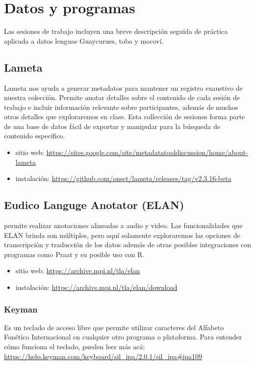 \documentclass[12pt]{article}
\begin{document}
\section{Datos y programas}
Las sesiones de trabajo incluyen una breve descripción seguida de práctica aplicada a datos lenguas Guaycurues, toba y mocoví.

\subsection{Lameta}
Lameta \citep{hatton.etal2021} nos ayuda a generar metadatos para mantener un registro exaustivo de nuestra colección. Permite anotar detalles sobre el contenido de cada sesión de trabajo e incluir información relevante sobre participantes, además de muchos otros detalles que exploraremos en clase. Esta collección de sesiones forma parte de una base de datos fácil de exportar y manipular para la búsqueda de contenido específico.
\begin{itemize}
\item sitio web: \url{https://sites.google.com/site/metadatatooldiscussion/home/about-lameta}
\item instalación: \url{https://github.com/onset/lameta/releases/tag/v2.3.16-beta} 
\end{itemize}


\subsection{Eudico Languge Anotator (ELAN)}

\citet{elan} permite realizar anotaciones alineadas a audio y video. Las funcionalidades que ELAN brinda son múltiples, pero aquí solamente exploraremos las opciones de transcripción y traducción de los datos además de otras posibles integraciones con programas como Praat y su posible uso con R.
\begin{itemize}
\item sitio web: \url{https://archive.mpi.nl/tla/elan} 

\item instalación: \url{https://archive.mpi.nl/tla/elan/download}
\end{itemize}
\subsubsection{Keyman}
Es un teclado de acceso libre que permite utilizar caracteres del Alfabeto Fonético Internacional en cualquier otro programa o plataforma. Para entender cómo funciona el teclado, pueden leer más acá: \url{https://help.keyman.com/keyboard/sil_ipa/2.0.1/sil_ipa#ipa109}
\end{document}
